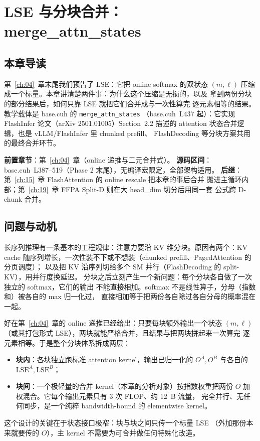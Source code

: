 \chapter{LSE 与分块合并：merge\_attn\_states}\label{ch:05}

\section{本章导读}

第~\ref{ch:04}~章末尾我们预告了 LSE：它把 online softmax 的双状态 $(m, \ell)$
压缩成一个标量。本章讲清楚两件事：为什么这个压缩是无损的，以及
拿到两份分块的部分结果后，如何只靠 LSE 就把它们合并成与一次性算完
逐元素相等的结果。教学载体是 base.cuh 的 \texttt{merge\_\allowbreak{}attn\_\allowbreak{}states}
（base.cuh~L437 起）：它实现 FlashInfer 论文（arXiv 2501.01005）Section~2.2
描述的 attention 状态合并逻辑，也是 vLLM/FlashInfer 里 chunked prefill、
FlashDecoding 等分块方案共用的最终合并环节。

\textbf{前置章节}：第~\ref{ch:04}~章（online 递推与二元合并式）。
\textbf{源码区间}：base.cuh~L387--519（Phase 2 末尾），无编译宏限定，全部架构适用。
\textbf{后继}：第~\ref{ch:15}~章 FlashAttention 的 online rescale 把本章的事后合并
搬进主循环内部；第~\ref{ch:19}~章 FFPA Split-D 则在大 head\_dim 切分后用同一套
公式跨 D-chunk 合并。

\section{问题与动机}

长序列推理有一条基本的工程规律：注意力要沿 KV 维分块。原因有两个：KV cache
随序列增长，一次性装不下或不想装（chunked prefill、PagedAttention 的分页调度）；
以及把 KV 沿序列切给多个 SM 并行（FlashDecoding 的 split-KV），用并行度换延迟。
分块之后立刻产生一个新问题：每个分块各自做了一次独立的 softmax，它们的输出
不能直接相加。softmax 不是线性算子，分母（指数和）被各自的 max 归一化过，
直接相加等于把两份各自除过各自分母的概率混在一起。

好在第~\ref{ch:04}~章的 online 递推已经给出：只要每块额外输出一个状态
$(m, \ell)$（或其打包形式 LSE），两块就能严格合并，且结果与把两块拼起来一次算完
逐元素相等。于是整个分块体系拆成两层：
\begin{itemize}
  \item \textbf{块内}：各块独立跑标准 attention kernel，输出已归一化的
        $O^{A}, O^{B}$ 与各自的 $\mathrm{LSE}^{A}, \mathrm{LSE}^{B}$；
  \item \textbf{块间}：一个极轻量的合并 kernel（本章的分析对象）按指数权重把两份
        $O$ 加权混合。它每个输出元素只有 3 次 FLOP、约 12~B 流量，
        完全并行、无任何同步，是一个纯粹 bandwidth-bound 的 elementwise kernel。
\end{itemize}
这个设计的关键在于状态接口极窄：块与块之间只传一个标量 LSE
（外加那份本来就要传的 $O$），主 kernel 不需要为可合并做任何特殊化改造。

